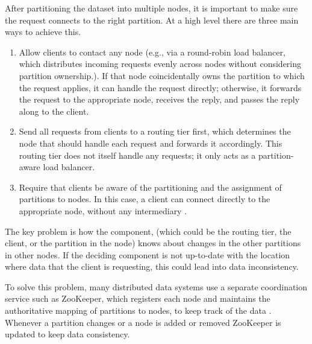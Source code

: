 After partitioning the dataset into multiple nodes, it is important to make sure the request connects to the right partition.
At a high level there are three main ways to achieve this. 
\begin{enumerate}
    \item Allow clients to contact any node (e.g., via a round-robin load balancer, which distributes incoming requests evenly across nodes without considering partition ownership.). If that node coincidentally owns the partition to which the request applies, it can handle the request directly; otherwise, it forwards the request to the appropriate node, receives the reply, and passes the reply along to the client.
    \item Send all requests from clients to a routing tier first, which determines the node that should handle each request and forwards it accordingly. This routing tier does not itself handle any requests; it only acts as a partition-aware load balancer.
    \item Require that clients be aware of the partitioning and the assignment of partitions to nodes. In this case, a client can connect directly to the appropriate node, without any intermediary \cite{Kleppmann_2017}. 
\end{enumerate}

The key problem is how the component, (which could be the routing tier, the client, or the partition in the node)
knows about changes in the other partitions in other nodes. If the deciding component is not up-to-date with the location where data that the client is requesting,
this could lead into data inconsistency. 

To solve this problem, many distributed data systems use a separate coordination service such as ZooKeeper, which registers each node
and maintains the authoritative mapping of partitions to nodes, to keep track of the data \cite{Kleppmann_2017}.
Whenever a partition changes or a node is added or removed ZooKeeper is updated to keep data consistency. 

